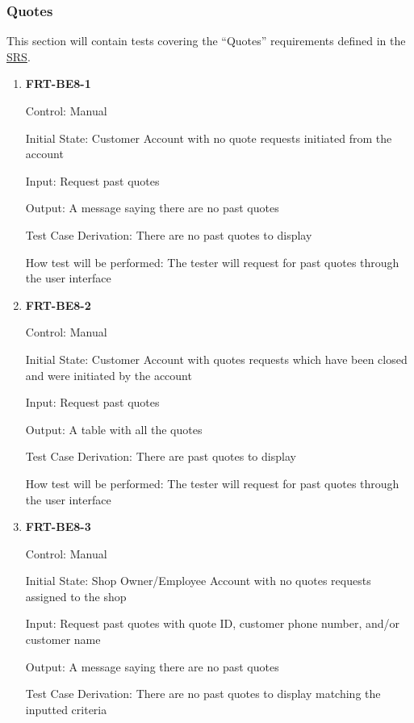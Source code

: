 \documentclass[12pt, titlepage]{article}
\begin{document}
\subsubsection{Quotes}

This section will contain tests covering the ``Quotes'' requirements defined in the
\href{https://github.com/arkinmodi/project-sayyara/blob/main/docs/SRS/SRS.pdf}{SRS}.

\begin{enumerate}
	\item \textbf{FRT-BE8-1}

	      Control: Manual

	      Initial State: Customer Account with no quote requests initiated from the account

	      Input: Request past quotes

	      Output: A message saying there are no past quotes

	      Test Case Derivation: There are no past quotes to display

	      How test will be performed: The tester will request for past quotes through the user interface

	\item \textbf{FRT-BE8-2}

	      Control: Manual

	      Initial State: Customer Account with quotes requests which have been closed and were initiated by
	      the account

	      Input: Request past quotes

	      Output: A table with all the quotes

	      Test Case Derivation: There are past quotes to display

	      How test will be performed: The tester will request for past quotes through the user interface

	\item \textbf{FRT-BE8-3}

	      Control: Manual

	      Initial State: Shop Owner/Employee Account with no quotes requests assigned to the shop

	      Input: Request past quotes with quote ID, customer phone number, and/or customer name

	      Output: A message saying there are no past quotes

	      Test Case Derivation: There are no past quotes to display matching the inputted criteria


\end{enumerate}
\end{document}

